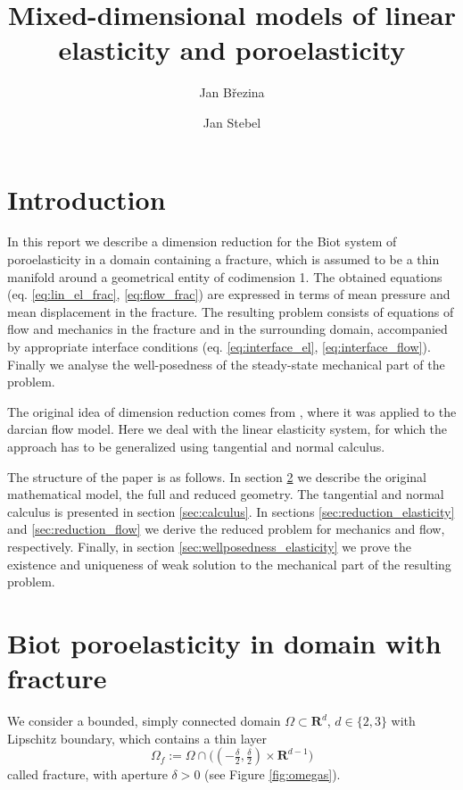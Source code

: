 \documentclass[a4paper]{article}
\def\Real{{\mathbf R}}
\newcommand{\eq}[1]{\begin{equation}#1\end{equation}}
\begin{document}
\title{Mixed-dimensional models of linear elasticity and poroelasticity}
\author{Jan Březina}
\author{Jan Stebel}
\maketitle

\section{Introduction}

In this report we describe a dimension reduction for the Biot system of poroelasticity in a domain containing a fracture, which is assumed to be a thin manifold around a geometrical entity of codimension 1.
The obtained equations (eq. \eqref{eq:lin_el_frac}, \eqref{eq:flow_frac}) are expressed in terms of mean pressure and mean displacement in the fracture.
The resulting problem consists of equations of flow and mechanics in the fracture and in the surrounding domain, accompanied by appropriate interface conditions (eq. \eqref{eq:interface_el}, \eqref{eq:interface_flow}).
Finally we analyse the well-posedness of the steady-state mechanical part of the problem.

The original idea of dimension reduction comes from \cite{martin_modeling_2005}, where it was applied to the darcian flow model. Here we deal with the linear elasticity system, for which the approach has to be generalized using tangential and normal calculus.

The structure of the paper is as follows.
In section \ref{sec:model} we describe the original mathematical model, the full and reduced geometry.
The tangential and normal calculus is presented in section \ref{sec:calculus}.
In sections \ref{sec:reduction_elasticity} and \ref{sec:reduction_flow} we derive the reduced problem for mechanics and flow, respectively.
Finally, in section \ref{sec:wellposedness_elasticity} we prove the existence and uniqueness of weak solution to the mechanical part of the resulting problem.


\section{Biot poroelasticity in domain with fracture}\label{sec:model}

We consider a bounded, simply connected domain $\Omega \subset \Real^d$, $d\in\{2,3\}$ with Lipschitz boundary, which contains a thin layer
\eq{ \Omega_f := \Omega\cap \big((-\tfrac\delta2,\tfrac\delta2)\times\Real^{d-1}\big) }
called fracture, with aperture $\delta>0$ (see Figure \ref{fig:omegas}).
\end{document}
